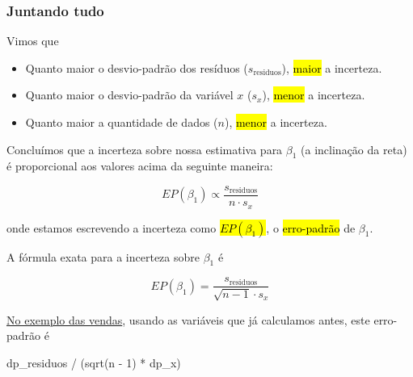 \documentclass[
  letterpaper,
  DIV=11,
  numbers=noendperiod]{scrreprt}
\newenvironment{Shaded}{\begin{snugshade}}{\end{snugshade}}
\newcommand{\DecValTok}[1]{\textcolor[rgb]{0.68,0.00,0.00}{#1}}
\newcommand{\FunctionTok}[1]{\textcolor[rgb]{0.28,0.35,0.67}{#1}}
\newcommand{\NormalTok}[1]{\textcolor[rgb]{0.00,0.23,0.31}{#1}}
\newcommand{\SpecialCharTok}[1]{\textcolor[rgb]{0.37,0.37,0.37}{#1}}
\providecommand{\tightlist}{%
  \setlength{\itemsep}{0pt}\setlength{\parskip}{0pt}}\usepackage{longtable,booktabs,array}
\begin{document}
\subsubsection{Juntando tudo}\label{juntando-tudo}

Vimos que

\begin{itemize}
\tightlist
\item
  Quanto maior o desvio-padrão dos resíduos ($s_{\text{residuos}}$),
  {\hl{maior}} a incerteza.
\item
  Quanto maior o desvio-padrão da variável $x$ ($s_x$), {\hl{menor}} a
  incerteza.
\item
  Quanto maior a quantidade de dados ($n$), {\hl{menor}} a incerteza.
\end{itemize}

Concluímos que a incerteza sobre nossa estimativa para $\beta_1$ (a
inclinação da reta) é proporcional aos valores acima da seguinte
maneira:

\[
EP(\beta_1) \propto \frac{s_{\text{residuos}}}{n \cdot s_x}
\]

onde estamos escrevendo a incerteza como {\hl{$EP(\beta_1)$}}, o
{\hl{erro-padrão}} de $\beta_1$.

\begin{tcolorbox}[enhanced jigsaw, opacitybacktitle=0.6, titlerule=0mm, coltitle=black, bottomtitle=1mm, left=2mm, opacityback=0, bottomrule=.15mm, colframe=quarto-callout-important-color-frame, arc=.35mm, title=\textcolor{quarto-callout-important-color}{\faExclamation}\hspace{0.5em}{Erro-padrão de $\beta_1$}, toprule=.15mm, colbacktitle=quarto-callout-important-color!10!white, toptitle=1mm, rightrule=.15mm, leftrule=.75mm, colback=white, breakable]

A fórmula exata para a incerteza sobre $\beta_1$ é

\[
EP(\beta_1) = \frac{s_{\text{residuos}}}{\sqrt{n - 1} \cdot s_x}
\]

\end{tcolorbox}

\hyperref[lm-vendas-tv]{No exemplo das vendas}, usando as variáveis que
já calculamos antes, este erro-padrão é

\begin{Shaded}
\begin{Highlighting}[]
\NormalTok{dp\_residuos }\SpecialCharTok{/}\NormalTok{ (}\FunctionTok{sqrt}\NormalTok{(n }\SpecialCharTok{{-}} \DecValTok{1}\NormalTok{) }\SpecialCharTok{*}\NormalTok{ dp\_x)}
\end{Highlighting}
\end{Shaded}
\end{document}
